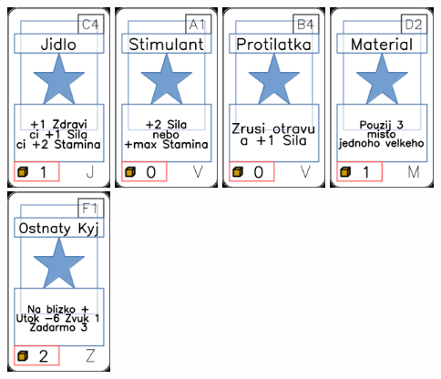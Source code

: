 \documentclass[a4paper]{article}
\begin{document}
	\includegraphics[width=3.0cm]{img-1_13}
	\includegraphics[width=3.0cm]{img-1_60}
	\includegraphics[width=3.0cm]{img-1_68}
	\includegraphics[width=3.0cm]{img-1_46}
	\includegraphics[width=3.0cm]{img-1_85}
\end{document}
